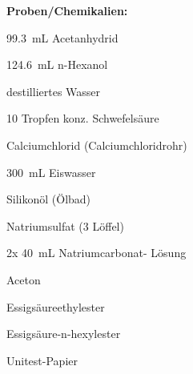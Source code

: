 \textbf{Proben/Chemikalien:}
\begin{itemize}
	\begin{minipage}{0.55 \textwidth}
		\item \SI{99,3}{\milli \liter} Acetanhydrid
		\item \SI{124,6}{\milli \liter} n-Hexanol
		\item destilliertes Wasser
		\item 10 Tropfen konz. Schwefelsäure
		\item Calciumchlorid (Calciumchloridrohr)
		\item \SI{300}{\milli \liter} Eiswasser
		\item Silikonöl (Ölbad)
	\end{minipage}
\begin{minipage}{0.35 \textwidth}
		\item Natriumsulfat (3 Löffel)
		\item 2x \SI{40}{\milli \liter} Natriumcarbonat- Lösung
		\item Aceton
		\item Essigsäureethylester
		\item Essigsäure-n-hexylester
		\item Unitest-Papier
\end{minipage}
\end{itemize}



